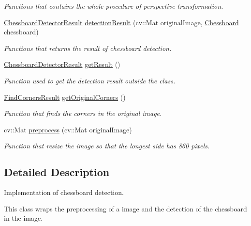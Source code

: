 \begin{DoxyCompactItemize}
\begin{DoxyCompactList}\small\item\em Functions that contains the whole procedure of perspective transformation. \end{DoxyCompactList}\item 
\hyperlink{structChessboardDetectorResult}{Chessboard\+Detector\+Result} \hyperlink{classChessboardDetector_a97550158d545864e639f0a6311f56f16}{detection\+Result} (cv\+::\+Mat original\+Image, \hyperlink{classChessboard}{Chessboard} chessboard)
\begin{DoxyCompactList}\small\item\em Functions that returns the result of chessboard detection. \end{DoxyCompactList}\item 
\hyperlink{structChessboardDetectorResult}{Chessboard\+Detector\+Result} \hyperlink{classChessboardDetector_a84f8880402d0829ed6fc13ed45a141c4}{get\+Result} ()
\begin{DoxyCompactList}\small\item\em Function used to get the detection result outside the class. \end{DoxyCompactList}\item 
\hyperlink{structFindCornersResult}{Find\+Corners\+Result} \hyperlink{classChessboardDetector_a7f8fd52d9bb23984c0db1c4115e75043}{get\+Original\+Corners} ()
\begin{DoxyCompactList}\small\item\em Function that finds the corners in the original image. \end{DoxyCompactList}\item 
cv\+::\+Mat \hyperlink{classChessboardDetector_a5860832e43410d526daf7415e5775aa9}{preprocess} (cv\+::\+Mat original\+Image)
\begin{DoxyCompactList}\small\item\em Function that resize the image so that the longest side has 860 pixels. \end{DoxyCompactList}\end{DoxyCompactItemize}


\subsection{Detailed Description}
Implementation of chessboard detection. 

This class wraps the preprocessing of a image and the detection of the chessboard in the image. 

